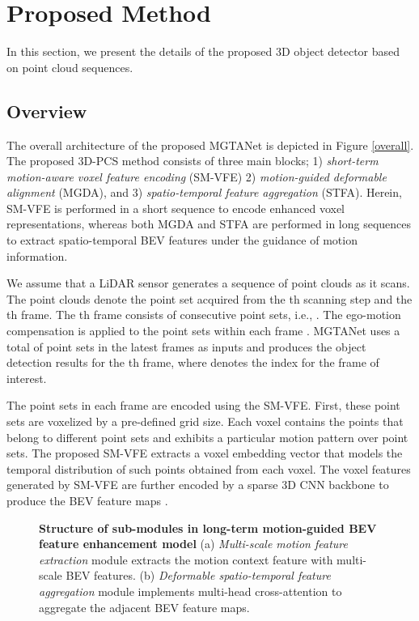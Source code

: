 \documentclass[letterpaper]{article} \usepackage{aaai23}  \usepackage{times}  \usepackage{helvet}  \usepackage{courier}  \usepackage[hyphens]{url}  \usepackage{graphicx} \urlstyle{rm} \def\UrlFont{\rm}  \usepackage{natbib}  \usepackage{caption} \frenchspacing  \setlength{\pdfpagewidth}{8.5in} \usepackage{algorithm}
\begin{document}
\section{Proposed Method}
In this section, we present the details of the proposed 3D object detector based on point cloud sequences.

\subsection{Overview}
The overall architecture of the proposed MGTANet is depicted in Figure \ref{overall}. The proposed 3D-PCS method consists of three main blocks; 1) {\it short-term motion-aware voxel feature encoding} (SM-VFE) 2) {\it motion-guided deformable alignment} (MGDA), and 3) {\it spatio-temporal feature aggregation} (STFA). Herein, SM-VFE is performed in a short sequence to encode enhanced voxel representations, whereas both MGDA and STFA are performed in long sequences to extract spatio-temporal BEV features under the guidance of motion information.

We assume that a LiDAR sensor generates a sequence of point clouds as it scans. The point clouds  denote the point set acquired from the th scanning step and the th frame.  The th frame consists of  consecutive point sets, i.e., . The ego-motion compensation is applied to the point sets within each frame \cite{nuscenes}. MGTANet uses a total of  point sets in the latest  frames  as inputs and produces the object detection results for the th frame, where  denotes the index for the frame of interest.

The  point sets in each frame are encoded using the SM-VFE. First, these  point sets are voxelized by a pre-defined grid size. Each voxel contains the points that belong to different point sets   and exhibits a particular motion pattern over  point sets. The proposed SM-VFE extracts a voxel embedding vector that models the temporal distribution of such points obtained from each voxel. 
The voxel features  generated by SM-VFE are further encoded by a sparse 3D CNN backbone to produce the  BEV feature maps  \cite{second}.

\begin{figure*}[t]
    
    \centering
    \begin{subfigure}[\textbf{Multi-scale motion feature extraction}]{\texttt{[image: figure/MGDA.pdf]}}
    \end{subfigure}
    \hspace{5mm}
    \begin{subfigure}[\textbf{Deformable spatio-temporal feature aggregation}]{\texttt{[image: figure/STFA.pdf]}}
    \end{subfigure}
    \caption {\textbf{Structure of sub-modules in  long-term motion-guided BEV feature enhancement model} (a) {\it Multi-scale motion feature extraction} module extracts the motion context feature with multi-scale BEV features. (b) {\it Deformable spatio-temporal feature aggregation} module implements multi-head cross-attention to aggregate the adjacent BEV feature maps. 
}
    \label{long_term_model}
\end{figure*}
\end{document}
